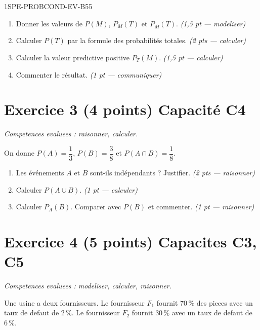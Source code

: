 \begin{evaluation}{1SPE-PROBCOND-EV-B}{55}
\begin{enumerate}
  \item Donner les valeurs de $P(M)$, $P_M(T)$ et $P_{\overline{M}}(T)$.
  \hfill\textit{(1,5 pt --- modeliser)}

  \item Calculer $P(T)$ par la formule des probabilités totales.
  \hfill\textit{(2 pts --- calculer)}

  \item Calculer la valeur predictive positive $P_T(M)$.
  \hfill\textit{(1,5 pt --- calculer)}

  \item Commenter le résultat.
  \hfill\textit{(1 pt --- communiquer)}
\end{enumerate}

\section*{Exercice 3 \hfill (4 points) \hfill Capacité C4}

\textit{Competences evaluees : raisonner, calculer.}

\medskip
On donne $P(A) = \dfrac{1}{3}$, $P(B) = \dfrac{3}{8}$ et $P(A \cap B) = \dfrac{1}{8}$.

\begin{enumerate}
  \item Les événements $A$ et $B$ sont-ils indépendants ? Justifier.
  \hfill\textit{(2 pts --- raisonner)}

  \item Calculer $P(A \cup B)$.
  \hfill\textit{(1 pt --- calculer)}

  \item Calculer $P_A(B)$. Comparer avec $P(B)$ et commenter.
  \hfill\textit{(1 pt --- raisonner)}
\end{enumerate}

\section*{Exercice 4 \hfill (5 points) \hfill Capacites C3, C5}

\textit{Competences evaluees : modeliser, calculer, raisonner.}

\medskip
Une usine a deux fournisseurs. Le fournisseur $F_1$ fournit $70\,\%$ des pieces avec un taux de defaut de $2\,\%$. Le fournisseur $F_2$ fournit $30\,\%$ avec un taux de defaut de $6\,\%$.


\end{evaluation}
